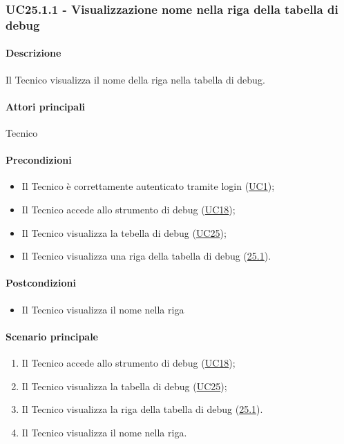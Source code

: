 
\subsubsection{UC25.1.1 - Visualizzazione nome nella riga della tabella di debug}\label{UC25point1point1}
\paragraph*{Descrizione}
Il Tecnico visualizza il nome della riga nella tabella di debug.

\paragraph*{Attori principali}
Tecnico

\paragraph*{Precondizioni}
\begin{itemize}
  \item Il Tecnico è correttamente autenticato tramite login (\hyperref[UC1]{UC1});
  \item Il Tecnico accede allo strumento di debug (\hyperref[UC18]{UC18});
  \item Il Tecnico visualizza la tebella di debug (\hyperref[UC25]{UC25});
  \item Il Tecnico visualizza una riga della tabella di debug (\hyperref[25point1]{25.1}).
\end{itemize}

\paragraph*{Postcondizioni}
\begin{itemize}
  \item Il Tecnico visualizza il nome nella riga
\end{itemize}

\paragraph*{Scenario principale}
\begin{enumerate}
  \item Il Tecnico accede allo strumento di debug (\hyperref[UC18]{UC18});
  \item Il Tecnico visualizza la tabella di debug (\hyperref[UC25]{UC25});
  \item Il Tecnico visualizza la riga della tabella di debug (\hyperref[UC25poin1]{25.1}).
  \item Il Tecnico visualizza il nome nella riga.
\end{enumerate}

